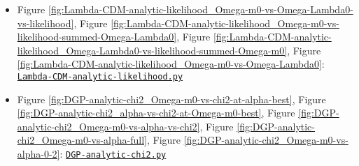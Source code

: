 \begin{appendix}
\begin{itemize}
    \item Figure \ref{fig:Lambda-CDM-analytic-likelihood_Omega-m0-vs-Omega-Lambda0-vs-likelihood}, Figure \ref{fig:Lambda-CDM-analytic-likelihood_Omega-m0-vs-likelihood-summed-Omega-Lambda0}, Figure \ref{fig:Lambda-CDM-analytic-likelihood_Omega-Lambda0-vs-likelihood-summed-Omega-m0}, Figure \ref{fig:Lambda-CDM-analytic-likelihood_Omega-m0-vs-Omega-Lambda0}: \href{https://github.com/DaHaCoder/bachelor-thesis/blob/main/code/Lambda-CDM-analytic-likelihood.py}{\lstinline{Lambda-CDM-analytic-likelihood.py}}
    \item Figure \ref{fig:DGP-analytic-chi2_Omega-m0-vs-chi2-at-alpha-best}, Figure \ref{fig:DGP-analytic-chi2_alpha-vs-chi2-at-Omega-m0-best}, Figure \ref{fig:DGP-analytic-chi2_Omega-m0-vs-alpha-vs-chi2}, Figure \ref{fig:DGP-analytic-chi2_Omega-m0-vs-alpha-full}, Figure \ref{fig:DGP-analytic-chi2_Omega-m0-vs-alpha-0-2}: \href{https://github.com/DaHaCoder/bachelor-thesis/blob/main/code/DGP-analytic-chi2.py}{\lstinline{DGP-analytic-chi2.py}}
\end{itemize}

\end{appendix}
